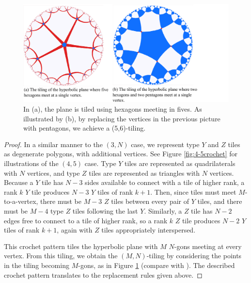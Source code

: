 \documentclass[11pt, oneside]{article}   	%
\begin{document}
\begin{figure}[h]
\centering
\includegraphics[width=.80\textwidth]{5-6transition.pdf}
\caption{In (a), the plane is tiled using hexagons meeting in fives. As illustrated by (b), by replacing the vertices in the previous picture with pentagons, we achieve a (5,6)-tiling.}
\label{fig:kaleido}
\end{figure}

\begin{proof}
In a similar manner to the $(3,N)$ case, we represent type $Y$ and $Z$ tiles as degenerate polygons, with additional vertices. See Figure \ref{fig:4-5crochet} for illustrations of the $(4,5)$ case. Type $Y$ tiles are represented as quadrilaterals with $N$ vertices, and type $Z$ tiles are represented as triangles with $N$ vertices. Because a $Y$ tile has $N-3$ sides available to connect with a tile of higher rank, a rank $k$ $Y$ tile produces $N-3$ $Y$ tiles of rank $k+1$. Then, since tiles must meet $M$-to-a-vertex, there must be $M-3$ $Z$ tiles between every pair of $Y$ tiles, and there must be $M-4$ type $Z$ tiles following the last $Y$. Similarly, a $Z$ tile has $N-2$ edges free to connect to a tile of higher rank, so a rank $k$ $Z$ tile produces $N-2$ $Y$ tiles of rank $k+1$, again with $Z$ tiles appropriately interspersed. 



This crochet pattern tiles the hyperbolic plane with $M$ $N$-gons meeting at every vertex. From this tiling, we obtain the $(M,N)$-tiling by considering the points in the tiling becoming $M$-gons, as in Figure \ref{fig:kaleido} (compare with \cite{symm}). The described crochet pattern translates to the replacement rules given above.
\end{proof}
\end{document}
